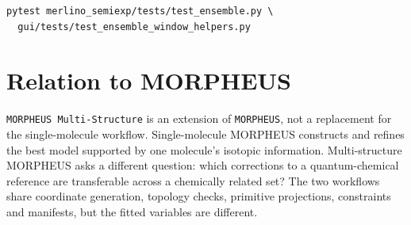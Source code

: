 \documentclass[11pt]{article}
\newcommand{\program}{\texttt{MORPHEUS Multi-Structure}}
\newcommand{\morpheus}{\texttt{MORPHEUS}}
\begin{document}
\begin{lstlisting}[style=merlino]
pytest merlino_semiexp/tests/test_ensemble.py \
  gui/tests/test_ensemble_window_helpers.py
\end{lstlisting}

\section{Relation to MORPHEUS}

\program{} is an extension of \morpheus{}, not a replacement for the
single-molecule workflow.  Single-molecule MORPHEUS constructs and refines the
best model supported by one molecule's isotopic information.  Multi-structure
MORPHEUS asks a different question: which corrections to a quantum-chemical
reference are transferable across a chemically related set?  The two workflows
share coordinate generation, topology checks, primitive projections,
constraints and manifests, but the fitted variables are different.
\end{document}

